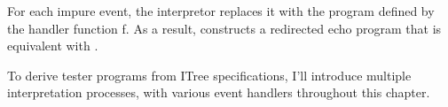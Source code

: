 For each impure event, the interpretor replaces it with the program defined by
the handler function \ilc f.  As a result,  constructs a
redirected echo program that is equivalent with .

To derive tester programs from ITree specifications, I'll introduce multiple
interpretation processes, with various event handlers throughout this chapter.
